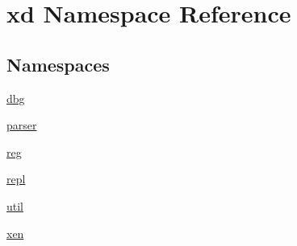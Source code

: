 \hypertarget{namespacexd}{}\section{xd Namespace Reference}
\label{namespacexd}
\subsection*{Namespaces}
\begin{DoxyCompactItemize}
\item 
 \mbox{\hyperlink{namespacexd_1_1dbg}{dbg}}
\item 
 \mbox{\hyperlink{namespacexd_1_1parser}{parser}}
\item 
 \mbox{\hyperlink{namespacexd_1_1reg}{reg}}
\item 
 \mbox{\hyperlink{namespacexd_1_1repl}{repl}}
\item 
 \mbox{\hyperlink{namespacexd_1_1util}{util}}
\item 
 \mbox{\hyperlink{namespacexd_1_1xen}{xen}}
\end{DoxyCompactItemize}
